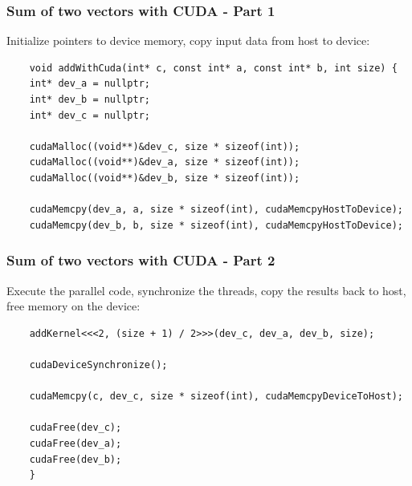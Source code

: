\documentclass{beamer}
\begin{document}

	\begin{frame} [fragile] 
	\frametitle{Sum of two vectors with CUDA - Part 1}
	Initialize pointers to device memory, copy input data from host to device:
	\begin{lstlisting}
	void addWithCuda(int* c, const int* a, const int* b, int size) {
	int* dev_a = nullptr;
	int* dev_b = nullptr;
	int* dev_c = nullptr;
	
	cudaMalloc((void**)&dev_c, size * sizeof(int));
	cudaMalloc((void**)&dev_a, size * sizeof(int));
	cudaMalloc((void**)&dev_b, size * sizeof(int));
	
	cudaMemcpy(dev_a, a, size * sizeof(int), cudaMemcpyHostToDevice);
	cudaMemcpy(dev_b, b, size * sizeof(int), cudaMemcpyHostToDevice);
	\end{lstlisting}
	\end{frame}
	
	
	\begin{frame} [fragile] 
	\frametitle{Sum of two vectors with CUDA - Part 2}
	Execute the parallel code, synchronize the threads, copy the results back to host,
	free memory on the device:
	\begin{lstlisting}
	addKernel<<<2, (size + 1) / 2>>>(dev_c, dev_a, dev_b, size);
	
	cudaDeviceSynchronize();
	
	cudaMemcpy(c, dev_c, size * sizeof(int), cudaMemcpyDeviceToHost);
	
	cudaFree(dev_c);
	cudaFree(dev_a);
	cudaFree(dev_b);
	}
	\end{lstlisting}
	\end{frame}
	
\end{document}
